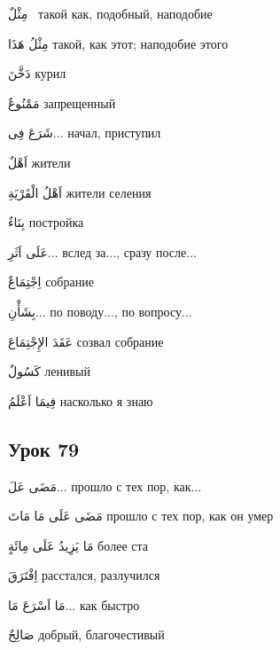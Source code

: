 \documentclass[a5paper]{article}
\newcommand\textstyleDropCaps[1]{#1}
\newcommand\textstyleCaptioncharacters[1]{#1}
\begin{document}
\textstyleCaptioncharacters{مِثْلٌ \ }\textstyleDropCaps{такой как, подоб­ный, наподобие‎}

\textstyleCaptioncharacters{مِثْلُ هَذَا }\textstyleDropCaps{такой, как этот; наподобие этого‎}

\textstyleCaptioncharacters{دَخَّنَ }\textstyleDropCaps{курил‎}

\textstyleCaptioncharacters{مَمْنُوعٌ }\textstyleDropCaps{запрещенный‎}

\textstyleCaptioncharacters{شَرَعَ فِى...ِ }\textstyleDropCaps{начал, при­ступил‎}

\textstyleCaptioncharacters{اَهْلٌ }\textstyleDropCaps{жители‎}

\textstyleCaptioncharacters{اَهْلُ الْقَرْيَةِ }\textstyleDropCaps{жители се­ления‎}

\textstyleCaptioncharacters{بِنَاءٌ }\textstyleDropCaps{постройка‎}

\textstyleCaptioncharacters{عَلَى اَثَرِ... }\textstyleDropCaps{вслед за..., сра­зу после...‎}

\textstyleCaptioncharacters{اِجْتِمَاعٌ }\textstyleDropCaps{собрание‎}

\textstyleCaptioncharacters{بِشَأْنِ...ِ }\textstyleDropCaps{по поводу..., по вопросу...‎}

\textstyleCaptioncharacters{عَقَدَ الإِجْتِمَاعَ }\textstyleDropCaps{созвал собрание‎}

\textstyleCaptioncharacters{كَسُولٌ }\textstyleDropCaps{ленивый‎}

\textstyleCaptioncharacters{فِيمَا اَعْلَمُ }\textstyleDropCaps{насколько я знаю‎}

\subsection[Урок 79‎]{\textstyleDropCaps{Урок 79‎}}
\textstyleCaptioncharacters{مَضَى عَلَ...ِ }\textstyleDropCaps{прошло с тех пор, как...‎}

\textstyleCaptioncharacters{مَضَى عَلَى مَا مَاتَ }\textstyleDropCaps{прошло с тех пор, как он умер‎}

\textstyleCaptioncharacters{مَا يَزِيدُ عَلَى مِائَةٍ }\textstyleDropCaps{бо­лее ста‎}

\textstyleCaptioncharacters{اِفْتَرَقَ }\textstyleDropCaps{расстался, разлу­чился‎}

\textstyleCaptioncharacters{مَا اَسْرَعَ مَا... }\textstyleDropCaps{как бы­стро‎}

\textstyleCaptioncharacters{صَالِحٌ }\textstyleDropCaps{добрый, благочестив­ый‎}
\end{document}
